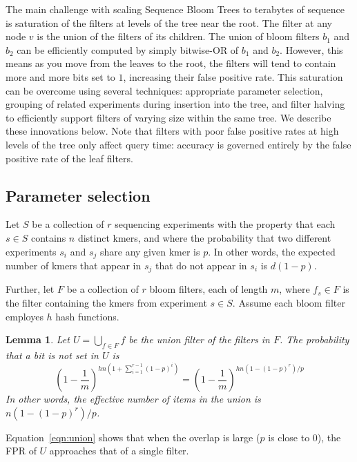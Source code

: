 \documentclass[11pt]{article}
\newtheorem{lem}{Lemma}
\begin{document}
The main challenge with scaling Sequence Bloom Trees to terabytes of sequence is saturation of the filters at levels of the tree near the root. The filter at any node $v$ is the union of the filters of its children. The union of bloom filters $b_1$ and $b_2$ can be efficiently computed by simply bitwise-OR of $b_1$ and $b_2$. However, this means as you move from the leaves to the root, the filters will tend to contain more and more bits set to $1$, increasing their false positive rate. This saturation can be overcome using several techniques: appropriate parameter selection, grouping of related experiments during insertion into the tree, and filter halving to efficiently support filters of varying size within the same tree. We describe these innovations below. Note that filters with poor false positive rates at high levels of the tree only affect query time: accuracy is governed entirely by the false positive rate of the leaf filters.

\subsection{Parameter selection}

Let $S$ be a collection of $r$ sequencing experiments with the property that each $s \in S$ contains $n$ distinct kmers, and where the probability that two different experiments $s_i$ and $s_j$ share any given kmer is $p$. In other words, the expected number of kmers that appear in $s_j$ that do not appear in $s_i$ is $d(1-p)$.

Further, let $F$ be a collection of $r$ bloom filters, each of length $m$, where $f_s \in F$ is the filter containing the kmers from  experiment $s \in S$. Assume each bloom filter employes $h$ hash functions.

\begin{lem}
Let $U = \bigcup_{f\in F} f$ be the union filter of the filters in $F$. The probability that a bit is not set in $U$ is
\begin{equation}\label{eqn:union}
\left(1 - \frac{1}{m}\right)^{hn\left(1+\sum_{i=1}^{r-1} (1-p)^i\right)} =
\left(1 - \frac{1}{m}\right)^{hn\left(1 - (1-p)^r\right)/p}
\end{equation}
In other words, the effective number of items in the union is $n(1-(1-p)^r)/p$.
\end{lem}
Equation~\ref{eqn:union} shows that when the overlap is large ($p$ is close to 0), the FPR of  $U$ approaches that of a single filter.
\end{document}
